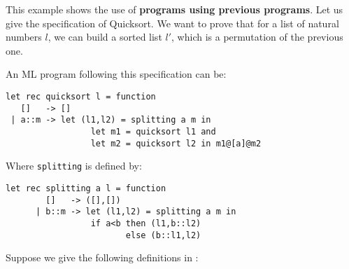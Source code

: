 This example shows the use of {\bf programs using previous
programs}. Let us give the specification of Quicksort. We want to
prove that for a list of natural numbers $l$, we can build a sorted
list $l'$, which is a permutation of the previous one.

An ML program following this specification can be:
\begin{verbatim}
let rec quicksort l = function
   []   -> []
 | a::m -> let (l1,l2) = splitting a m in
                 let m1 = quicksort l1 and
                 let m2 = quicksort l2 in m1@[a]@m2
\end{verbatim}
Where \verb=splitting= is defined by:
\begin{verbatim}
let rec splitting a l = function
        []   -> ([],[])
      | b::m -> let (l1,l2) = splitting a m in
                 if a<b then (l1,b::l2)
                        else (b::l1,l2)
\end{verbatim}
Suppose we give the following definitions in \Coq:


